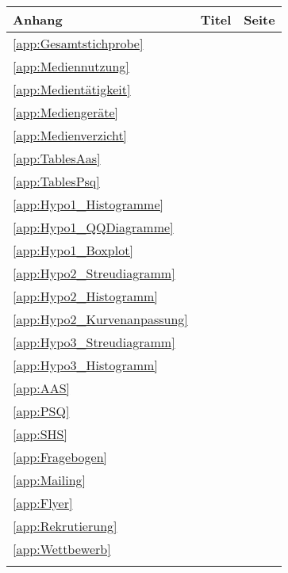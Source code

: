 \begin{table}[ht]
\begin{tabular}{l m{27em}  r}
  \hline
  Anhang & Titel & Seite \\
  \hline
  \ref{app:Gesamtstichprobe} & \nameref{app:Gesamtstichprobe} &   \pageref{app:Gesamtstichprobe}\\
  \ref{app:Mediennutzung} & \nameref{app:Mediennutzung} & \pageref{app:Mediennutzung}\\
  \ref{app:Medientätigkeit} & \nameref{app:Medientätigkeit} & \pageref{app:Medientätigkeit}\\
  \ref{app:Mediengeräte} & \nameref{app:Mediengeräte} & \pageref{app:Mediengeräte}\\
  \ref{app:Medienverzicht} & \nameref{app:Medienverzicht} & \pageref{app:Medienverzicht}\\
  \ref{app:TablesAas} & \nameref{app:TablesAas} & \pageref{app:TablesAas}\\
  \ref{app:TablesPsq} & \nameref{app:TablesPsq} & \pageref{app:TablesPsq}\\
  \ref{app:Hypo1_Histogramme} & \nameref{app:Hypo1_Histogramme} & \pageref{app:Hypo1_Histogramme}\\
  \ref{app:Hypo1_QQDiagramme} & \nameref{app:Hypo1_QQDiagramme} & \pageref{app:Hypo1_QQDiagramme}\\
  \ref{app:Hypo1_Boxplot} & \nameref{app:Hypo1_Boxplot} & \pageref{app:Hypo1_Boxplot}\\
  \ref{app:Hypo2_Streudiagramm} & \nameref{app:Hypo2_Streudiagramm} & \pageref{app:Hypo2_Streudiagramm}\\
  \ref{app:Hypo2_Histogramm} & \nameref{app:Hypo2_Histogramm} & \pageref{app:Hypo2_Histogramm}\\
  \ref{app:Hypo2_Kurvenanpassung} & \nameref{app:Hypo2_Kurvenanpassung} & \pageref{app:Hypo2_Kurvenanpassung}\\
  \ref{app:Hypo3_Streudiagramm} & \nameref{app:Hypo3_Streudiagramm} & \pageref{app:Hypo3_Streudiagramm}\\
  \ref{app:Hypo3_Histogramm} & \nameref{app:Hypo3_Histogramm} & \pageref{app:Hypo3_Histogramm}\\
  \ref{app:AAS} & \nameref{app:AAS} & \pageref{app:AAS}\\
  \ref{app:PSQ} & \nameref{app:PSQ} & \pageref{app:PSQ}\\
  \ref{app:SHS} & \nameref{app:SHS} & \pageref{app:SHS}\\
  \ref{app:Fragebogen} & \nameref{app:Fragebogen} & \pageref{app:Fragebogen}\\
  \ref{app:Mailing} & \nameref{app:Mailing} & \pageref{app:Mailing}\\
  \ref{app:Flyer} & \nameref{app:Flyer} & \pageref{app:Flyer}\\
  \ref{app:Rekrutierung} & \nameref{app:Rekrutierung} & \pageref{app:Rekrutierung}\\
  \ref{app:Wettbewerb} & \nameref{app:Wettbewerb} & \pageref{app:Wettbewerb}\\
  \hline
  &&\\
\end{tabular}
\end{table}
